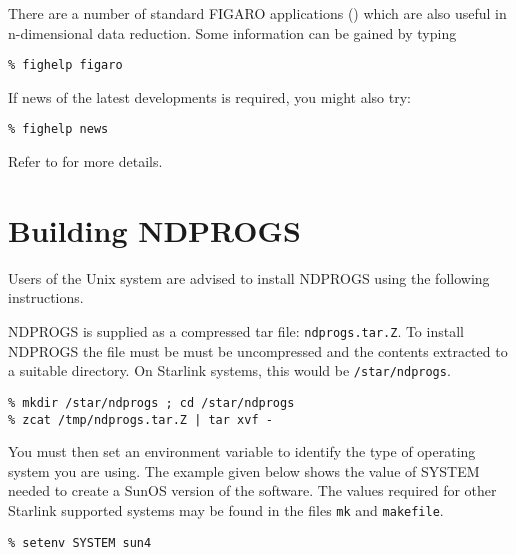 There are a number of standard FIGARO applications ()
which are also useful in
n-dimensional data reduction. Some information can be gained by typing

\begin{myquote}
\begin{verbatim}
% fighelp figaro
\end{verbatim}
\end{myquote}

If news of the latest developments is required, you might also try:

\begin{myquote}
\begin{verbatim}
% fighelp news
\end{verbatim}
\end{myquote}

Refer to 
for more details.

\section{Building NDPROGS{}} 
\label{sec:building}

Users of the Unix system are advised to install NDPROGS
using the following instructions. 

NDPROGS is supplied as a compressed tar file: {\tt ndprogs.tar.Z}. To install 
NDPROGS the file must be must be uncompressed and the contents extracted to a
suitable directory.  On Starlink systems, this would be {\tt /star/ndprogs}.

\begin{myquote} 
\begin{verbatim}
% mkdir /star/ndprogs ; cd /star/ndprogs
% zcat /tmp/ndprogs.tar.Z | tar xvf -
\end{verbatim}
\end{myquote}

You must then set an environment variable to identify the type of
operating system you are using. The example given below shows the value
of SYSTEM needed to create a SunOS version of the software. The values
required for other Starlink supported systems may be found in the files
{\tt mk} and {\tt makefile}.
 
\begin{myquote}
\begin{verbatim}
% setenv SYSTEM sun4
\end{verbatim}
\end{myquote}
 
